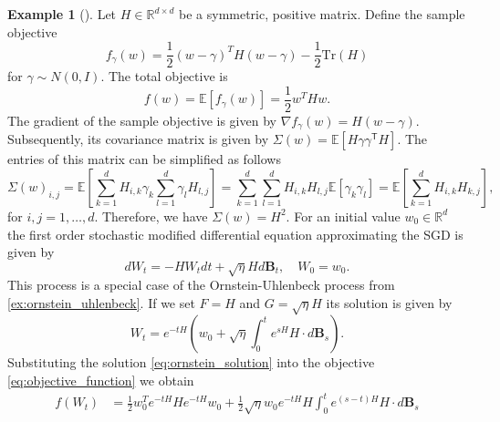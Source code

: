 \documentclass[12pt]{article}
\theoremstyle{definition}
\newtheorem{example}[example]{Example}
\numberwithin{equation}{section}
\newcommand{\R}{\mathbb{R}}
\newcommand{\T}{\mathsf{T}}
\newcommand{\ev}[1]{\mathbb{E}\left[{#1}\right]}
\begin{document}
\begin{example}[\autocite{liStochasticModifiedEquations2019}]
  \label{ex:quadratic_smde}
  Let $H \in \R^{d\times d}$ be a symmetric, positive matrix. Define the sample objective 
\begin{equation*}
  f_{\gamma}(w) = \frac{1}{2} (w - \gamma)^T H (w - \gamma) - \frac{1}{2} \text{Tr}(H)
\end{equation*}
for $\gamma \sim N(0,I)$.  
The total objective is
\begin{equation}
  \label{eq:objective_function}
  f(w) = \ev{f_{\gamma}(w)} = \frac{1}{2} w^T H w.
\end{equation}
The gradient of the sample objective is given by $\nabla f_\gamma(w) = H(w-\gamma)$. Subsequently, its covariance matrix is given by $\Sigma(w) = \ev{H\gamma \gamma^\T H}$. The entries of this matrix can be simplified as follows
\begin{equation*}
  \Sigma(w)_{i,j} = \ev{\sum_{k=1}^d H_{i,k} \gamma_k \sum_{l=1}^d\gamma_l H_{l,j}} = \sum_{k=1}^d \sum_{l=1}^d H_{i,k} H_{l,j}\ev{ \gamma_k \gamma_l}=\ev{\sum_{k=1}^d H_{i,k}H_{k,j}},
\end{equation*}
for $i,j=1,\dots,d$.  
Therefore, we have $\Sigma(w) = H^2$.
For an initial value $w_0 \in \R^d$ the first order stochastic modified differential equation approximating the SGD is given by
\begin{equation*}
  dW_t = -H W_t dt + \sqrt{\eta}H d\pmb{B}_t, \quad W_0 = w_0.
\end{equation*}
This process is a special case of the Ornstein-Uhlenbeck process from \autoref{ex:ornstein_uhlenbeck}. If we set $F = H$ and $G = \sqrt{\eta}H$ its solution is given by
\begin{equation}
  \label{eq:ornstein_solution}
  W_t = e^{-t H}\left(w_0 + \sqrt{\eta}\int_0^te^{s H}H \cdot d\pmb{B}_s\right).
\end{equation}
Substituting the solution \eqref{eq:ornstein_solution} into the objective \eqref{eq:objective_function} we obtain
\begin{equation}
  \label{eq:expected_value_ornstein}
  \begin{split}
    f(W_t) &= \frac{1}{2} w_0^T e^{-tH}He^{-tH}w_0 +
     \frac{1}{2} \sqrt{\eta}w_0e^{-tH}H\int_0^t e^{(s-t)H}H\cdot d\pmb{B}_s \\ 

\end{split}
\end{equation}
\end{example}
\end{document}
